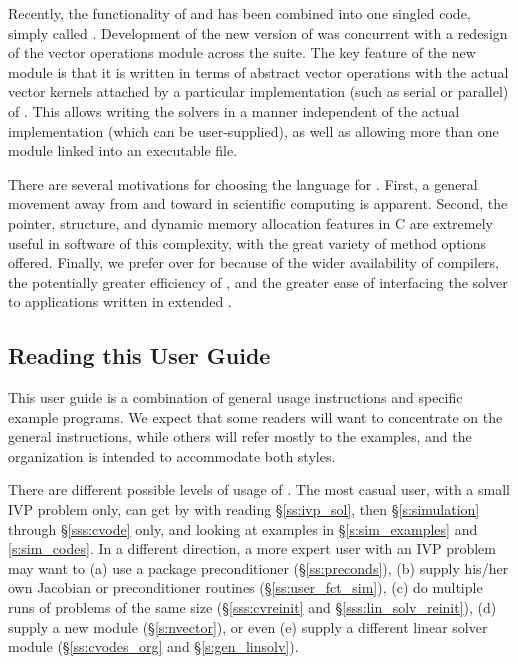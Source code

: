 Recently, the functionality of {\cvode} and {\pvode} has been combined into
one singled code, simply called {\cvode}.
Development of the new version of {\cvode} was concurrent with a redesign of the vector operations module
across the {\sundials} suite. The key feature of the new {\nvector} module is that it
is written in terms of abstract vector operations with the actual vector kernels attached
by a particular implementation (such as serial or parallel) of {\nvector}. This allows
writing the {\sundials} solvers in a manner independent of the actual {\nvector} 
implementation (which can be user-supplied), as well as allowing more than one 
{\nvector} module linked into an executable file.

There are several motivations for choosing the {\C} language for {\cvode}.
First, a general movement away from {\F} and toward {\C} in scientific
computing is apparent.  Second, the pointer, structure, and dynamic
memory allocation features in C are extremely useful in software of
this complexity, with the great variety of method options offered.
Finally, we prefer {\C} over {\CPP} for {\cvode} because of the wider
availability of {\C} compilers, the potentially greater efficiency of {\C},
and the greater ease of interfacing the solver to applications written
in extended {\F}.

\subsection{Reading this User Guide}\label{ss:reading}

This user guide is a combination of general usage instructions and
specific example programs.  We expect that some readers will want to
concentrate on the general instructions, while others will refer
mostly to the examples, and the organization is intended to
accommodate both styles.

There are different possible levels of usage of {\cvode}. The most casual
user, with a small IVP problem only, can get by with reading \S\ref{ss:ivp_sol}, 
then \S\ref{s:simulation} through \S\ref{sss:cvode} only, and looking at examples 
in \S\ref{s:sim_examples} and \A\ref{s:sim_codes}. 
In a different direction, a more expert user with an IVP problem may want
to (a) use a package preconditioner (\S\ref{ss:preconds}), (b) supply
his/her own Jacobian or preconditioner routines (\S\ref{ss:user_fct_sim}),
(c) do multiple runs of problems of the same size (\S\ref{sss:cvreinit} and
\S\ref{sss:lin_solv_reinit}), (d) supply a new {\nvector} module
(\S\ref{s:nvector}), or even (e) supply a different linear solver module
(\S\ref{ss:cvodes_org} and \S\ref{s:gen_linsolv}).


